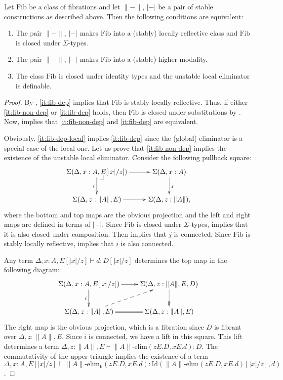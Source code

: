 \documentclass[reqno]{mscs}
\makeatletter
\newcommand{\fs}[1]{\mathrm{#1}}
\newcommand{\Id}{\fs{Id}}
\newcommand{\Fib}{\fs{Fib}}
\numberwithin{figure}{section}
\newcommand{\pb}[1][dr]{\save*!/#1-1.2pc/#1:(-1,1)@^{|-}\restore}
\makeatother
\begin{document}
\begin{prop}
Let $\Fib$ be a class of fibrations and let $\| - \|$, $| - |$ be a pair of stable constructions as described above.
Then the following conditions are equivalent:
\begin{enumerate}
\item \label{it:fib-non-dep} The pair $\| - \|$, $| - |$ makes $\Fib$ into a (stably) locally reflective class and $\Fib$ is closed under $\Sigma$-types.
\item \label{it:fib-dep} The pair $\| - \|$, $| - |$ makes $\Fib$ into a (stable) higher modality.
\item \label{it:fib-dep-local} The class $\Fib$ is closed under identity types and the unstable local eliminator is definable.
\end{enumerate}
\end{prop}
\begin{proof}
By , \eqref{it:fib-dep} implies that $\Fib$ is stably locally reflective.
Thus, if either \eqref{it:fib-non-dep} or \eqref{it:fib-dep} holds, then $\Fib$ is closed under substitutions by .
Now,  implies that \eqref{it:fib-non-dep} and \eqref{it:fib-dep} are equivalent.

Obviously, \eqref{it:fib-dep-local} implies \eqref{it:fib-dep} since the (global) eliminator is a special case of the local one.
Let us prove that \eqref{it:fib-non-dep} implies the existence of the unstable local eliminator.
Consider the following pullback square:
\[ \xymatrix{ \Sigma(\Delta, x : A, E[|x|/z]) \ar[r] \ar[d]_i \pb   & \Sigma(\Delta, x : A) \ar[d]^j \\
              \Sigma(\Delta, z : \| A \|, E) \ar[r]                 & \Sigma(\Delta, z : \| A \|),
            } \]
where the bottom and top maps are the obvious projection and the left and right maps are defined in terms of $| - |$.
Since $\Fib$ is closed under $\Sigma$-types,  implies that it is also closed under composition.
Then  implies that $j$ is connected.
Since $\Fib$ is stably locally reflective,  implies that $i$ is also connected.

Any term $\Delta, x : A, E[|x|/z] \vdash d : D[|x|/z]$ determines the top map in the following diagram:
\[ \xymatrix{ \Sigma(\Delta, x : A, E[|x|/z]) \ar[r] \ar[d]_i           & \Sigma(\Delta, z : \| A \|, E, D) \ar@{->>}[d] \\
              \Sigma(\Delta, z : \| A \|, E) \ar@{-->}[ur] \ar@{=}[r]   & \Sigma(\Delta, z : \| A \|, E)
            } \]
The right map is the obvious projection, which is a fibration since $D$ is fibrant over $\Delta, z : \| A \|, E$.
Since $i$ is connected, we have a lift in this square.
This lift determines a term $\Delta, z : \| A \|, E \vdash \| A \|\text{-}\fs{elim}(z E. D, x E. d) : D$.
The commutativity of the upper triangle implies the existence of a term $\Delta, x : A, E[|x|/z] \vdash \| A \|\text{-}\fs{elim_h}(z E. D, x E .d) : \Id(\| A \|\text{-}\fs{elim}(z E. D, x E. d)[|x|/z],d)$.
\end{proof}
\end{document}
